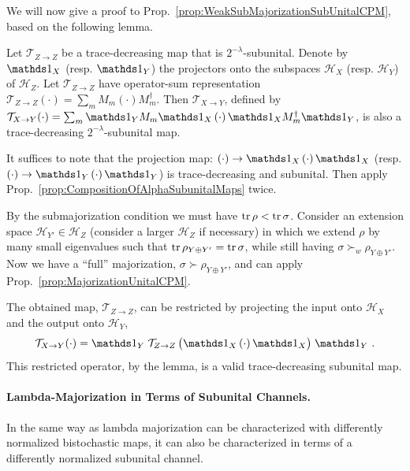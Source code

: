 \documentclass[12pt,a4paper]{article}
\def\Hs{\mathscr{H}}%
\newenvironment{myproof}[1][\proofname]{%
  \color{prooftextcolor} \footnotesize \proof[\itshape #1]\hspace*{1.2mm}%
}{\endproof}
\begin{document}
We will now give a proof to Prop.~\ref{prop:WeakSubMajorizationSubUnitalCPM}, based on the following lemma.
\begin{lemma}
  \label{lemma:AlphaSubUnitalCompWithProj}
  Let $\mathcal{T}_{Z\rightarrow Z}$ be a trace-decreasing map that is $2^{-\lambda}$-subunital. Denote by
  $\Ident_X$ (resp. $\Ident_Y$) the projectors onto the subspaces $\Hs_X$ (resp. $\Hs_Y$) of $\Hs_Z$. Let
  $\mathcal{T}_{Z\rightarrow Z}$ have operator-sum representation
  $\mathcal{T}_{Z\rightarrow Z}(\cdot) = \sum_m M_m\left(\cdot\right)M_m^\dagger$. Then
  $\mathcal{T}_{X\rightarrow Y}$, defined by
  $\mathcal{T}_{X\rightarrow Y}(\cdot) = \sum_m \Ident_Y M_m\Ident_X \left(\cdot\right) \Ident_X M_m^\dagger\Ident_Y$,
  is also a trace-decreasing $2^{-\lambda}$-subunital map.
\end{lemma}
\begin{myproof}[Proof of Lemma~\ref{lemma:AlphaSubUnitalCompWithProj}]
  It suffices to note that the projection map: $\left(\cdot\right) \rightarrow \Ident_X \left(\cdot\right) \Ident_X$
  (resp. $\left(\cdot\right) \rightarrow \Ident_Y \left(\cdot\right) \Ident_Y$) is trace-decreasing and subunital.
  Then apply Prop.~\ref{prop:CompositionOfAlphaSubunitalMaps} twice.
\end{myproof}

\begin{myproof}[Proof of Prop.~\ref{prop:WeakSubMajorizationSubUnitalCPM}]
  By the submajorization condition we must have $\operatorname{tr}\rho < \operatorname{tr}\sigma$. Consider an extension space
  $\Hs_{Y'}\in\Hs_Z$ (consider a larger $\Hs_Z$ if necessary) in which we extend $\rho$ by many small
  eigenvalues such that $\operatorname{tr} \rho_{Y\oplus Y'} = \operatorname{tr}\sigma$, while still having $\sigma \succ_w \rho_{Y\oplus Y'}$.
  Now we have a ``full'' majorization, $\sigma\succ\rho_{Y\oplus Y'}$, and can apply
  Prop.~\ref{prop:MajorizationUnitalCPM}.

  The obtained map, $\mathcal{T}_{Z\rightarrow Z}$, can be restricted by projecting the input onto $\Hs_X$
  and the output onto $\Hs_Y$,
  \begin{align*}
    \mathcal{T}_{X\rightarrow Y}(\cdot)
    = \Ident_Y\; \mathcal{T}_{Z\rightarrow Z}\,\bigl(\Ident_X \left(\cdot\right) \Ident_X \bigr)\; \Ident_Y\ .
  \end{align*}
  This restricted operator, by the lemma, is a valid trace-decreasing subunital map.
\end{myproof}

\paragraph{Lambda-Majorization in Terms of Subunital Channels.}
In the same way as lambda majorization can be characterized with differently normalized bistochastic maps,
it can also be characterized in terms of a differently normalized subunital channel.
\end{document}

